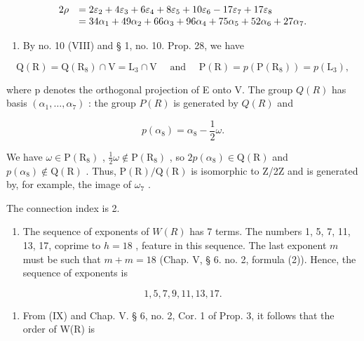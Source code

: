 \[
\begin{array}{r l} 2 \rho & = 2 \varepsilon_ {2} + 4 \varepsilon_ {3} + 6 \varepsilon_ {4} + 8 \varepsilon_ {5} + 10 \varepsilon_ {6} - 17 \varepsilon_ {7} + 17 \varepsilon_ {8} \\ & = 34 \alpha_ {1} + 49 \alpha_ {2} + 66 \alpha_ {3} + 96 \alpha_ {4} + 75 \alpha_ {5} + 52 \alpha_ {6} + 27 \alpha_ {7}. \end{array}
\]

\begin{enumerate}
\def\labelenumi{(\Roman{enumi})}
\setcounter{enumi}{7}
\tightlist
\item
  By no. 10 (VIII) and § 1, no. 10. Prop. 28, we have
\end{enumerate}

\[
\mathrm{Q} (\mathrm{R}) = \mathrm{Q} (\mathrm{R} _ {8}) \cap \mathrm{V} = \mathrm{L} _ {3} \cap \mathrm{V} \quad \text { and } \quad \mathrm{P} (\mathrm{R}) = p (\mathrm{P} (\mathrm{R} _ {8})) = p (\mathrm{L} _ {3}),
\]

where p denotes the orthogonal projection of E onto V. The group \(Q(R)\) has basis \((\alpha_{1},\ldots,\alpha_{7})\) : the group \(P(R)\) is generated by \(Q(R)\) and

\[
p (\alpha_ {8}) = \alpha_ {8} - \frac {1}{2} \omega .
\]

We have \(\omega\in\mathrm{P}(\mathrm{R}_{8})\) , \(\frac{1}{2}\omega\notin\mathrm{P}(\mathrm{R}_{8})\) , so \(2p(\alpha_{8})\in\mathrm{Q}(\mathrm{R})\) and \(p(\alpha_{8})\notin\mathrm{Q}(\mathrm{R})\) . Thus, \(\mathrm{P}(\mathrm{R})/\mathrm{Q}(\mathrm{R})\) is isomorphic to Z/2Z and is generated by, for example, the image of \(\omega_{7}\) .

The connection index is 2.

\begin{enumerate}
\def\labelenumi{(\Roman{enumi})}
\setcounter{enumi}{8}
\tightlist
\item
  The sequence of exponents of \(W(R)\) has 7 terms. The numbers 1, 5, 7, 11, 13, 17, coprime to \(h = 18\) , feature in this sequence. The last exponent \(m\) must be such that \(m + m = 18\) (Chap. V, § 6. no. 2, formula (2)). Hence, the sequence of exponents is
\end{enumerate}

\[
1, 5, 7, 9, 11, 13, 17.
\]

\begin{enumerate}
\def\labelenumi{(\Alph{enumi})}
\setcounter{enumi}{23}
\tightlist
\item
  From (IX) and Chap. V. § 6, no. 2, Cor. 1 of Prop. 3, it follows that the order of W(R) is
\end{enumerate}

